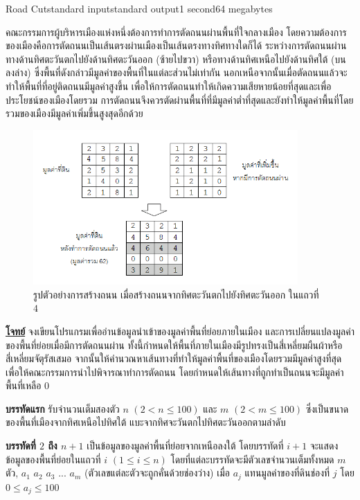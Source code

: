 \documentclass[11pt,a4paper]{article}
\begin{document}
\begin{problem}{Road Cut}{standard input}{standard output}{1 second}{64 megabytes}

คณะกรรมการผู้บริหารเมืองแห่งหนึ่งต้องการทำการตัดถนนผ่านพื้นที่ใจกลางเมือง โดยความต้องการของเมืองคือการตัดถนนเป็นเส้นตรงผ่านเมืองเป็นเส้นตรงทางทิศทางใดก็ได้ ระหว่างการตัดถนนผ่านทางด้านทิศตะวันตกไปยังด้านทิศตะวันออก (ซ้ายไปขวา) หรือทางด้านทิศเหนือไปยังด้านทิศใต้ (บนลงล่าง) ซึ่งพื้นที่ดังกล่าวมีมูลค่าของพื้นที่ในแต่ละส่วนไม่เท่ากัน  นอกเหนือจากนั้นเมื่อตัดถนนแล้วจะทำให้พื้นที่ที่อยู่ติดถนนมีมูลค่าสูงขึ้น เพื่อให้การตัดถนนทำให้เกิดความเสียหายน้อยที่สุดและเพื่อประโยชน์ของเมืองโดยรวม การตัดถนนจึงควรตัดผ่านพื้นที่ที่มีมูลค่าต่ำที่สุดและยังทำให้มูลค่าพื้นที่โดยรวมของเมืองมีมูลค่าเพิ่มขึ้นสูงสุดอีกด้วย

\begin{figure}[h]
\centering
\includegraphics[width=0.9\textwidth]{../latex/img/1044/1044-1.png}
\caption{รูปตัวอย่างการสร้างถนน เมื่อสร้างถนนจากทิศตะวันตกไปยังทิศตะวันออก ในแถวที่ $4$}
\end{figure}

\bigskip
\underline{\textbf{โจทย์}}  จงเขียนโปรแกรมเพื่ออ่านข้อมูลนำเข้าของมูลค่าพื้นที่ย่อยภายในเมือง และการเปลี่ยนแปลงมูลค่าของพื้นที่ย่อยเมื่อมีการตัดถนนผ่าน ทั้งนี้กำหนดให้พื้นที่ภายในเมืองมีรูปทรงเป็นสี่เหลี่ยมผืนผ้าหรือสี่เหลี่ยมจัตุรัสเสมอ จากนั้นให้คำนวณหาเส้นทางที่ทำให้มูลค่าพื้นที่ของเมืองโดยรวมมีมูลค่าสูงที่สุดเพื่อให้คณะกรรมการนำไปพิจารณาทำการตัดถนน โดยกำหนดให้เส้นทางที่ถูกทำเป็นถนนจะมีมูลค่าพื้นที่เหลือ $0$

\InputFile

\textbf{บรรทัดแรก} รับจำนวนเต็มสองตัว $n$ $(2 < n \leq 100)$ และ $m$ $(2 < m \leq 100)$ ซึ่งเป็นขนาดของพื้นที่เมืองจากทิศเหนือไปทิศใต้ แบะจากทิศจะวันตกไปทิศตะวันออกตามลำดับ

\textbf{บรรทัดที่ $2$ ถึง $n+1$} เป็นข้อมูลของมูลค่าพื้นที่ย่อยจากเหนือลงใต้ โดยบรรทัดที่ $i+1$ จะแสดงข้อมูลของพื้นที่ย่อยในแถวที่ $i$ $(1 \leq i \leq n)$ โดยที่แต่ละบรรทัดจะมีตัวเลขจำนวนเต็มทั้งหมด $m$ ตัว, $a_1$ $a_2$ $a_3$ $...$ $a_m$ (ตัวเลขแต่ละตัวจะถูกคั่นด้วยช่องว่าง) เมื่อ $a_j$ แทนมูลค่าของที่ดินช่องที่ $j$ โดย $0 \leq a_j \leq 100$ 



\end{problem}
\end{document}
